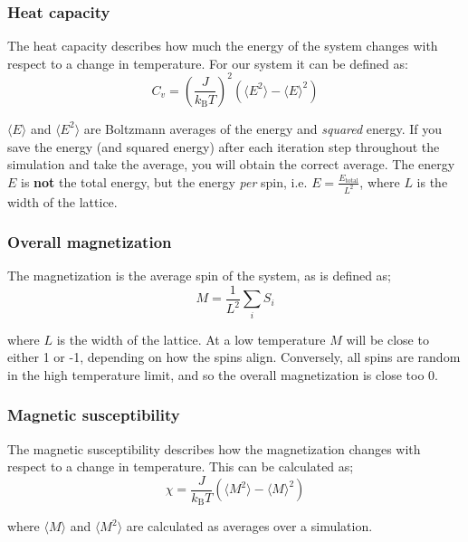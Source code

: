 \documentclass{article}
\begin{document}
\subsubsection{Heat capacity}

The heat capacity describes how much the energy of the system changes with respect to
a change in temperature. For our system it can be defined as:
\begin{equation}
C_v = \left( \frac{J}{k_{\mathrm{B}}T} \right)^2 \left( \langle E^2 \rangle - \langle E \rangle^2 \right)
\end{equation}

$\langle E \rangle$
and $\langle E^2 \rangle$ are Boltzmann averages of the energy
and \textit{squared} energy.
If you save the energy (and squared energy) after each iteration step throughout
the simulation and take the average, you will obtain the correct average.
The energy $E$ is \textbf{not} the total energy, but the
energy \textit{per} spin, i.e. $E = \frac{E_\mathrm{total}}{L^2}$,
where $L$ is the width of the lattice.

\subsubsection{Overall magnetization}

The magnetization is the average spin of the system, as is defined as;
\begin{equation}
M =\frac{1}{L^2} \sum_i S_i
\end{equation}

where $L$ is the width of the lattice.
At a low temperature $M$ will be close to either 1 or -1,
depending on how the spins align.
Conversely, all spins are random in the high temperature limit, and so
the overall magnetization is close too 0.

\subsubsection{Magnetic susceptibility}
The magnetic susceptibility describes how the magnetization changes with respect to a change in temperature.
This can be calculated as;
\begin{equation}
\chi = \frac{J}{k_{\mathrm{B}}T} \left( \langle M^2 \rangle - \langle M \rangle^2 \right)
\end{equation}

where $\langle M \rangle$ and $\langle M^2 \rangle$ are calculated as averages over a simulation.
\end{document}
